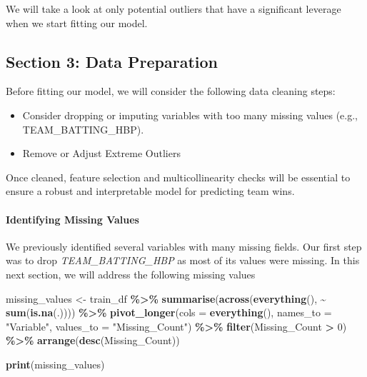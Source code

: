 \documentclass[
]{article}
\newenvironment{Shaded}{\begin{snugshade}}{\end{snugshade}}
\newcommand{\AttributeTok}[1]{\textcolor[rgb]{0.13,0.29,0.53}{#1}}
\newcommand{\DecValTok}[1]{\textcolor[rgb]{0.00,0.00,0.81}{#1}}
\newcommand{\FunctionTok}[1]{\textcolor[rgb]{0.13,0.29,0.53}{\textbf{#1}}}
\newcommand{\NormalTok}[1]{#1}
\newcommand{\OtherTok}[1]{\textcolor[rgb]{0.56,0.35,0.01}{#1}}
\newcommand{\SpecialCharTok}[1]{\textcolor[rgb]{0.81,0.36,0.00}{\textbf{#1}}}
\newcommand{\StringTok}[1]{\textcolor[rgb]{0.31,0.60,0.02}{#1}}
\begin{document}
We will take a look at only potential outliers that have a significant
leverage when we start fitting our model.

\subsection{Section 3: Data
Preparation}\label{section-3-data-preparation}

Before fitting our model, we will consider the following data cleaning
steps:

\begin{itemize}
\item
  Consider dropping or imputing variables with too many missing values
  (e.g., TEAM\_BATTING\_HBP).
\item
  Remove or Adjust Extreme Outliers
\end{itemize}

Once cleaned, feature selection and multicollinearity checks will be
essential to ensure a robust and interpretable model for predicting team
wins.

\paragraph{Identifying Missing Values}\label{identifying-missing-values}

We previously identified several variables with many missing fields. Our
first step was to drop \emph{TEAM\_BATTING\_HBP} as most of its values
were missing. In this next section, we will address the following
missing values

\begin{Shaded}
\begin{Highlighting}[]
\NormalTok{missing\_values }\OtherTok{\textless{}{-}}\NormalTok{ train\_df }\SpecialCharTok{\%\textgreater{}\%}
  \FunctionTok{summarise}\NormalTok{(}\FunctionTok{across}\NormalTok{(}\FunctionTok{everything}\NormalTok{(), }\SpecialCharTok{\textasciitilde{}} \FunctionTok{sum}\NormalTok{(}\FunctionTok{is.na}\NormalTok{(.)))) }\SpecialCharTok{\%\textgreater{}\%}
  \FunctionTok{pivot\_longer}\NormalTok{(}\AttributeTok{cols =} \FunctionTok{everything}\NormalTok{(), }\AttributeTok{names\_to =} \StringTok{"Variable"}\NormalTok{, }\AttributeTok{values\_to =} \StringTok{"Missing\_Count"}\NormalTok{) }\SpecialCharTok{\%\textgreater{}\%}
  \FunctionTok{filter}\NormalTok{(Missing\_Count }\SpecialCharTok{\textgreater{}} \DecValTok{0}\NormalTok{) }\SpecialCharTok{\%\textgreater{}\%}
  \FunctionTok{arrange}\NormalTok{(}\FunctionTok{desc}\NormalTok{(Missing\_Count))}

\FunctionTok{print}\NormalTok{(missing\_values)}
\end{Highlighting}
\end{Shaded}
\end{document}
